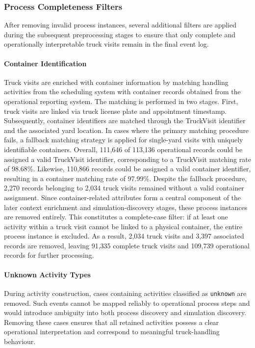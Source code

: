           \subsubsection{Process Completeness Filters} 
          After removing invalid process instances, several additional filters are applied during the subsequent preprocessing stages to ensure that only complete and operationally interpretable truck visits remain in the final event log. \paragraph{Container Identification} 
          Truck visits are enriched with container information by matching handling activities from the scheduling system with container records obtained from the operational reporting system. The matching is performed in two stages. First, truck visits are linked via truck license plate and appointment timestamp. Subsequently, container identifiers are matched through the TruckVisit identifier and the associated yard location. In cases where the primary matching procedure fails, a fallback matching strategy is applied for single-yard visits with uniquely identifiable containers. Overall, 111,646 of 113,136 operational records could be assigned a valid TruckVisit identifier, corresponding to a TruckVisit matching rate of 98.68\%. Likewise, 110,866 records could be assigned a valid container identifier, resulting in a container matching rate of 97.99\%. Despite the fallback procedure, 2,270 records belonging to 2,034 truck visits remained without a valid container assignment. Since container-related attributes form a central component of the later context enrichment and simulation-discovery stages, these process instances are removed entirely. This constitutes a complete-case filter: if at least one activity within a truck visit cannot be linked to a physical container, the entire process instance is excluded. As a result, 2,034 truck visits and 3,397 associated records are removed, leaving 91,335 complete truck visits and 109,739 operational records for further processing. 
          \paragraph{Unknown Activity Types} 
          During activity construction, cases containing activities classified as \texttt{unknown} are removed. Such events cannot be mapped reliably to operational process steps and would introduce ambiguity into both process discovery and simulation discovery. Removing these cases ensures that all retained activities possess a clear operational interpretation and correspond to meaningful truck-handling behaviour. 
